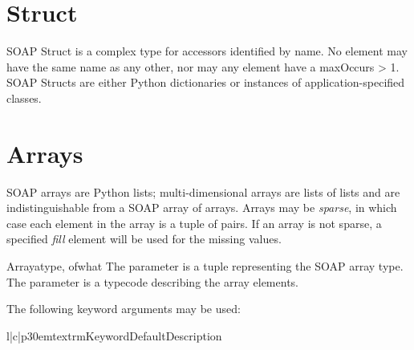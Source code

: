 \section{Struct}

SOAP Struct is a complex type for accessors identified by name. No element may
have the same name as any other, nor may any element have a maxOccurs > 1.
SOAP Structs are either Python dictionaries or instances of application-specified classes.

\section{Arrays}

SOAP arrays are Python lists; multi-dimensional arrays are
lists of lists and are indistinguishable from a SOAP array of arrays.
Arrays may be \emph{sparse}, in which case each element in the
array is a tuple of  pairs.
If an array is not sparse, a specified \emph{fill} element will be
used for the missing values.


\begin{classdesc}{Array}{atype, ofwhat}
The  parameter is a  tuple representing the SOAP
array type. The  parameter is a typecode describing the array elements.
\end{classdesc}

The following keyword arguments may be used:

\begin{tableiii}{l|c|p{30em}}{textrm}{Keyword}{Default}{Description}
\end{tableiii}


